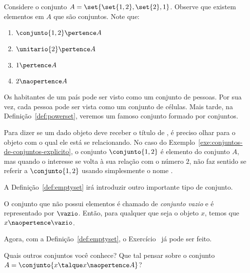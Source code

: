\begin{example}
    \label{exe:conjuntos-de-conjuntos-explicito}
    Considere o conjunto $A = \set{\set{1,2},\set{2}, 1}$. Observe que existem elementos em $A$ que são conjuntos. Note que:
    \begin{enumerate}
        \item $\conjunto{1, 2} \pertence A$
        \item $\unitario{2} \pertence A$
        \item $1 \pertence A$
        \item $2 \naopertence A$
    \end{enumerate}
\end{example}

\begin{example}
    \label{exe:conjuntos-de-conjuntos-implicito}
    Os habitantes de um país pode ser visto como um conjunto de pessoas. Por sua vez, cada pessoa pode ser vista como um conjunto de células. Mais tarde, na Definição~\ref{def:powerset}, veremos um famoso conjunto formado por conjuntos.
\end{example}

Para dizer se um dado objeto deve receber o título de , é preciso olhar para o objeto com o qual ele está se relacionando. No caso do Exemplo~\ref{exe:conjuntos-de-conjuntos-explicito}, o conjunto $\conjunto{1, 2}$ é elemento do conjunto $A$, mas quando o interesse se volta à sua relação com o número $2$, não faz sentido se referir a $\conjunto{1, 2}$ usando simplesmente o nome .

A Definição~\ref{def:emptyset} irá introduzir outro importante tipo de conjunto.

\begin{definition}
    \label{def:emptyset} %
    O conjunto que não possui elementos é chamado de \emph{conjunto vazio} e é representado por $\vazio$. Então, para qualquer que seja o objeto $x$, temos que $x \naopertence \vazio$.
\end{definition}

Agora, com a Definição~\ref{def:emptyset}, o Exercício~ já pode ser feito.

\begin{example}
    Quais outros conjuntos você conhece? Que tal pensar sobre o conjunto $A = \conjunto{ x \talque x \naopertence A}$?
\end{example}
